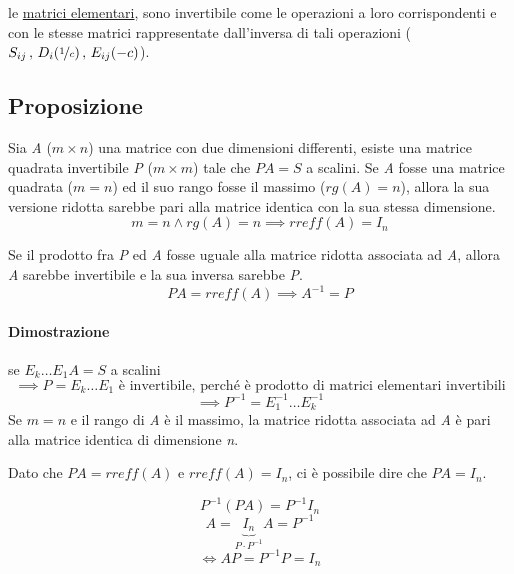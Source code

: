 			le \underline{matrici elementari}, sono invertibile come le operazioni a loro corrispondenti e con le stesse matrici rappresentate dall'inversa di tali operazioni ($ S_{ij} \, , \, D_i(\nicefrac{1}{c}) \, , \, E_{ij}(-c)$).
		
		
		\subsection{Proposizione} \label{proposizone_sistemi_lineari}
			Sia \textit{A} ($m \times n$) una matrice con due dimensioni differenti, esiste una matrice quadrata invertibile \textit{P} ($m \times m$) tale che $PA = S$ a scalini.
			Se \textit{A} fosse una matrice quadrata ($m = n$) ed il suo rango fosse il massimo ($rg(A) = n$), allora la sua versione ridotta sarebbe pari alla matrice identica con la sua stessa dimensione.
			$$ m = n \wedge rg(A) = n \implies rreff(A) = I_n $$
			
			Se il prodotto fra \textit{P} ed \textit{A} fosse uguale alla matrice ridotta associata ad \textit{A}, allora \textit{A} sarebbe invertibile e la sua inversa sarebbe \textit{P}.
			$$ PA = rreff(A) \implies A^{-1} = P $$
			
			\begin{GrayBox}
				\paragraph{Dimostrazione} se $ E_k \dots E_1 A = S $ a scalini
				$$ \implies P = E_k \dots E_1 \text{ è invertibile, perché è prodotto di matrici elementari invertibili} $$
				$$ \implies P^{-1} = E_1^{-1} \dots E_k^{-1} $$
				Se $m = n$ e il rango di \textit{A} è il massimo, la matrice ridotta associata ad \textit{A} è pari alla matrice identica di dimensione \textit{n}.
				
				Dato che $ PA = rreff(A) $ e $ rreff(A) = I_n $, ci è possibile dire che $ PA = I_n $.
				
				$$ P^{-1} (PA) = P^{-1} I_n $$
				$$ A = \underbrace{I_n}_{P \cdot P^{-1}} A = P^{-1} $$
				$$ \iff AP = P^{-1} P = I_n $$ 
			\end{GrayBox}
		
